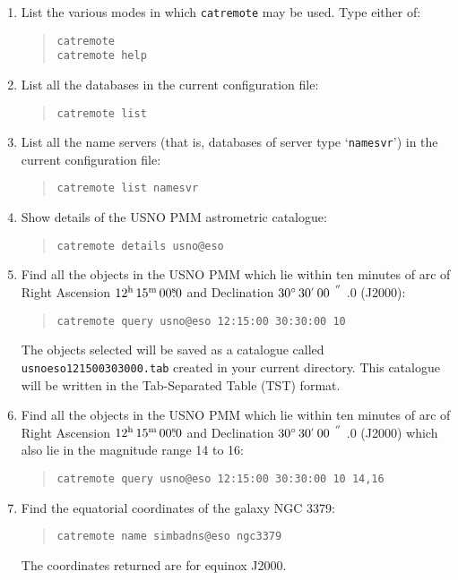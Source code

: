 \documentclass[twoside,11pt]{article}
\newcommand{\arcsec} {$\hspace{-0.05em}\raisebox{-0.5ex}
                     {$^{'\hspace{-0.1em}'}$}
                     \hspace{-0.7em}.\hspace{-0.05em}$}
\newcommand{\tsec}   {\mbox{$^{\rm s}\!\!.$}}
\newcommand{\hms}[4] {$#1^{\rm h}\,#2^{\rm m}\,#3\tsec#4$}
\newcommand{\dms}[4] {$#1^{\circ}\,#2\raisebox{-0.5ex}{$^{'}$}\,#3\arcsec#4$}
\renewcommand{\_}{\texttt{\symbol{95}}}
\begin{document}
\begin{enumerate}

  \item List the various modes in which {\tt catremote} may be used.
   Type either of:

  \begin{quote}
   {\tt catremote} \\
   {\tt catremote help}
  \end{quote}

  \item List all the databases in the current configuration file:

  \begin{quote}
   {\tt catremote list}
  \end{quote}

  \item List all the name servers (that is, databases of server type
   `{\tt namesvr}') in the current configuration file:

  \begin{quote}
   {\tt catremote list namesvr}
  \end{quote}

  \item Show details of the USNO PMM astrometric catalogue:

  \begin{quote}
   {\tt catremote details usno@eso}
  \end{quote}

  \item Find all the objects in the USNO PMM which lie within ten
   minutes of arc of Right Ascension \hms{12}{15}{00}{0} and
   Declination \dms{30}{30}{00}{0} (J2000):

  \begin{quote}
   {\tt catremote query usno@eso 12:15:00 30:30:00 10}
  \end{quote}

   The objects selected will be saved as a catalogue called {\tt
   usno\_eso\_121500\_303000.tab} created in your current directory.
   This catalogue will be written in the Tab-Separated Table (TST)
   format.

  \item Find all the objects in the USNO PMM which lie within ten
   minutes of arc of Right Ascension \hms{12}{15}{00}{0} and
   Declination \dms{30}{30}{00}{0} (J2000) which also lie in the
   magnitude range 14 to 16:

  \begin{quote}
   {\tt catremote query usno@eso 12:15:00 30:30:00 10 14,16}
  \end{quote}

  \item Find the equatorial coordinates of the galaxy NGC 3379:

  \begin{quote}
   {\tt catremote name simbad\_ns@eso ngc3379}
  \end{quote}

   The coordinates returned are for equinox J2000.

\end{enumerate}
\end{document}

